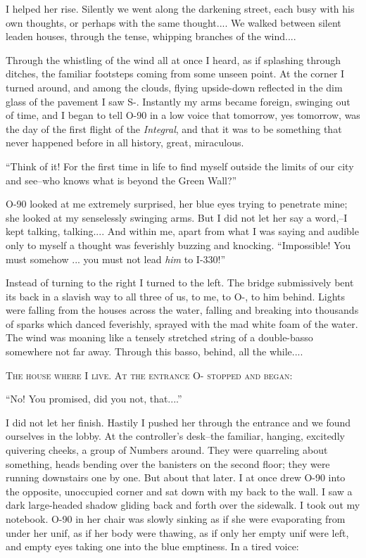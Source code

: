 \documentclass[11pt,openany]{book}
\begin{document}
I helped her rise. Silently we went along the darkening street, each busy with his own thoughts, or perhaps with the same thought.... We walked between silent leaden houses, through the tense, whipping branches of the wind....

Through the whistling of the wind all at once I heard, as if splashing through ditches, the familiar footsteps coming from some unseen point. At the corner I turned around, and among the clouds, flying upside-down reflected in the dim glass of the pavement I saw S-. Instantly my arms became foreign, swinging out of time, and I began to tell O-90 in a low voice that tomorrow, yes tomorrow, was the day of the first flight of the \emph{Integral}, and that it was to be something that never happened before in all history, great, miraculous.

``Think of it! For the first time in life to find myself outside the limits of our city and see--who knows what is beyond the Green Wall?''

O-90 looked at me extremely surprised, her blue eyes trying to penetrate mine; she looked at my senselessly swinging arms. But I did not let her say a word,--I kept talking, talking.... And within me, apart from what I was saying and audible only to myself a thought was feverishly buzzing and knocking. ``Impossible! You must somehow ... you must not lead \emph{him} to I-330!''

Instead of turning to the right I turned to the left. The bridge submissively bent its back in a slavish way to all three of us, to me, to O-, to him behind. Lights were falling from the houses across the water, falling and breaking into thousands of sparks which danced feverishly, sprayed with the mad white foam of the water. The wind was moaning like a tensely stretched string of a double-basso somewhere not far away. Through this basso, behind, all the while....

\begin{center}\textsc{The house where I live. At the entrance O- stopped and began:}\end{center}

``No! You promised, did you not, that....''

I did not let her finish. Hastily I pushed her through the entrance and we found ourselves in the lobby. At the controller's desk--the familiar, hanging, excitedly quivering cheeks, a group of Numbers around. They were quarreling about something, heads bending over the banisters on the second floor; they were running downstairs one by one. But about that later. I at once drew O-90 into the opposite, unoccupied corner and sat down with my back to the wall. I saw a dark large-headed shadow gliding back and forth over the sidewalk. I took out my notebook. O-90 in her chair was slowly sinking as if she were evaporating from under her unif, as if her body were thawing, as if only her empty unif were left, and empty eyes taking one into the blue emptiness. In a tired voice:
\end{document}
